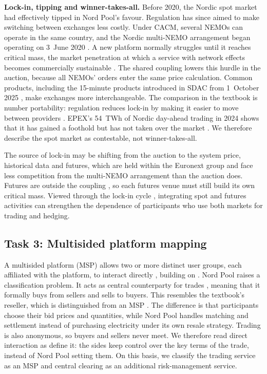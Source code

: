 \textbf{Lock-in, tipping and winner-takes-all.} Before 2020, the Nordic spot market had effectively tipped in Nord Pool's favour. Regulation has since aimed to make switching between exchanges less costly. Under CACM, several NEMOs can operate in the same country, and the Nordic multi-NEMO arrangement began operating on 3~June 2020 \citep{EPEX2020,CACM2015}. A new platform normally struggles until it reaches critical mass, the market penetration at which a service with network effects becomes commercially sustainable \citep[Section~9.3]{OverbyAudestad2021}. The shared coupling lowers this hurdle in the auction, because all NEMOs' orders enter the same price calculation. Common products, including the 15-minute products introduced in SDAC from 1~October 2025 \citep{OTE2025,NPMTU}, make exchanges more interchangeable. The comparison in the textbook is number portability: regulation reduces lock-in by making it easier to move between providers \citep[Section~12.6]{OverbyAudestad2021}. EPEX's 54~TWh of Nordic day-ahead trading in 2024 shows that it has gained a foothold but has not taken over the market \citep{EPEX2025}. We therefore describe the spot market as contestable, not winner-takes-all.

The source of lock-in may be shifting from the auction to the system price, historical data and futures, which are held within the Euronext group and face less competition from the multi-NEMO arrangement than the auction does. Futures are outside the coupling \citep{CACM2015}, so each futures venue must still build its own critical mass. Viewed through the lock-in cycle \citep[Section~12.4]{OverbyAudestad2021}, integrating spot and futures activities can strengthen the dependence of participants who use both markets for trading and hedging.

\subsection{Task 3: Multisided platform mapping}
\label{sec:t3}

A multisided platform (MSP) allows two or more distinct user groups, each affiliated with the platform, to interact directly \citep[Def.~10.1]{OverbyAudestad2021}, building on \citet{HagiuWright2015}. Nord Pool raises a classification problem. It acts as central counterparty for trades \citep{NPClearing}, meaning that it formally buys from sellers and sells to buyers. This resembles the textbook's reseller, which is distinguished from an MSP \citep[Section~10.5]{OverbyAudestad2021}. The difference is that participants choose their bid prices and quantities, while Nord Pool handles matching and settlement instead of purchasing electricity under its own resale strategy. Trading is also anonymous, so buyers and sellers never meet. We therefore read direct interaction as \citet{HagiuWright2015} define it: the sides keep control over the key terms of the trade, instead of Nord Pool setting them. On this basis, we classify the trading service as an MSP and central clearing as an additional risk-management service.

